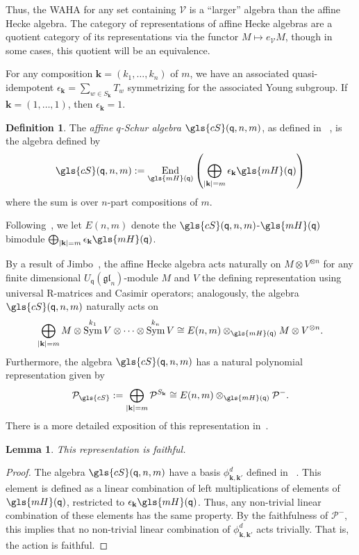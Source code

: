 \documentclass[10pt]{article}
\newtheorem{lemma}[theorem]{Lemma}
\theoremstyle{definition}
\newtheorem{defi}[theorem]{Definition}
\DeclareMathOperator{\Sym}{Sym}
\DeclareMathOperator{\End}{End}
\newcommand{\wellsep}{\mathscr{V}}
\newcommand{\Bk}{\mathbf{k}}
\newcommand{\pq}{\mathsf{q}}
\newcommand{\cP}{\mathcal{P}}
\newcommand{\cS}{\gls{cS}}
\begin{document}
Thus, the WAHA for any set containing $\wellsep$ is a ``larger'' algebra than the affine Hecke
algebra. The category of representations of affine Hecke algebras are
a quotient category of its representations via the functor $M\mapsto e_{\wellsep}M$, though in some cases, this
quotient will be an equivalence. 

For any composition $\Bk=(k_1,\dots, k_n)$ of $m$, we have an associated
quasi-idempotent $\epsilon_{\Bk}=\sum_{w\in S_{\Bk}}T_w$ symmetrizing for the associated Young
subgroup. If $\Bk=(1,\dots, 1)$, then $\epsilon_{\Bk}=1$.

\begin{defi}\label{def:cS}
 The \emph{affine $q$-Schur algebra} $\cS(\pq,n,m)$, as defined in
~\cite[Def.~2.1.4]{GreenSchur}, is the algebra defined
 by
 \[\cS(\pq,n,m):=
 \End_{\gls{mH}(\pq)}\left(\bigoplus_{|\Bk|=m}\epsilon_{\Bk}\gls{mH}(\pq)
 \right)%
 \] where the sum is over $n$-part compositions of $m$.
\end{defi}
Following~\cite{GreenSchur}, we let $E(n,m)$ denote the $\cS(\pq,n,m)$-$\gls{mH}(\pq)$ bimodule $\bigoplus_{|\Bk|=m}\epsilon_{\Bk}\gls{mH}(\pq)$.


By a result of Jimbo~\cite{Jimbo}, the affine Hecke algebra acts naturally on $M\otimes V^{\otimes n}$ for any finite
dimensional $U_{\pq}(\mathfrak{gl}_n)$-module $M$ and $V$ the defining
representation using universal R-matrices and Casimir operators; analogously, the
algebra $\cS(\pq,n,m)$ naturally acts on
\[\bigoplus _{|\Bk|=m}M\otimes \Sym^{ k_1}V\otimes \cdots\otimes
\Sym^{k_n}V\cong E(n,m)\otimes_{\gls{mH}(\pq)}M\otimes V^{\otimes n}.\]
Furthermore, the algebra $\cS(\pq,n,m)$ has a natural 
polynomial representation given by
\[\cP_{\cS}:=\bigoplus_{|\Bk|=m}
 \cP^{S_{\Bk}}\cong E(n,m)\otimes_{\gls{mH}(\pq)}\cP^-.\]
There is a more detailed exposition of this representation in~\cite[\S~4]{MiSt}.
\begin{lemma}
 This representation is faithful.
\end{lemma}
\begin{proof}
 The algebra $\cS(\pq,n,m)$ have a basis $\phi^d_{\Bk,\Bk'}$ defined in
~\cite[Def.~2.2.3]{GreenSchur}. This element is defined as a linear
 combination of left multiplications of elements of $\gls{mH}(\pq)$,
 restricted to $\epsilon_{\Bk}\gls{mH}(\pq)$. Thus, any non-trivial linear
 combination of these elements has the same property.
 By the faithfulness of
 $\cP^-$, this implies that no non-trivial linear combination of
 $\phi^d_{\Bk,\Bk'}$ acts trivially. That is, the action is
 faithful. 
\end{proof}
\end{document}
